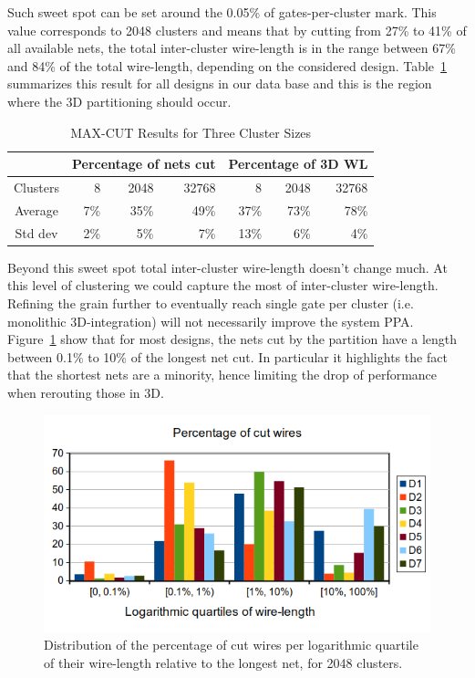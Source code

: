 \documentclass[conference]{IEEEtran}
\begin{document}
Such sweet spot can be set around the 0.05\% of gates-per-cluster mark. This value corresponds to 2048 clusters and means that by cutting from 27\% to 41\% of all available nets, the total inter-cluster wire-length is in the range between 67\% and 84\% of the total wire-length, depending on the considered design. Table~\ref{tab:res} summarizes this result for all designs in our data base and this is the region where the 3D partitioning should occur. 
\begin{table}[!t]
\renewcommand{\arraystretch}{1.25}
\caption{MAX-CUT Results for Three Cluster Sizes}
\label{tab:res}
\centering
\begin{tabular}{|c|r|r|r|r|r|r|}
\cline{2-7}
\multicolumn{1}{c|}{} & \multicolumn{3}{c|}{Percentage of nets cut} & \multicolumn{3}{c|}{Percentage of 3D WL}\\
\hline
\multicolumn{1}{|c|}{Clusters} & 8 & 2048 & 32768 & 8 & 2048 & 32768\\
\hline
Average & 7\% & 35\% & 49\% & 37\% & 73\% & 78\%\\
\hline
Std dev & 2\% & 5\% & 7\% & 13\% & 6\% & 4\%\\
\hline
\end{tabular}
\end{table}
Beyond this sweet spot total inter-cluster wire-length doesn't change much. At this level of clustering we could capture the most of inter-cluster wire-length. Refining the grain further to eventually reach single gate per cluster (i.e. monolithic 3D-integration) will not necessarily improve the system PPA.\\
Figure~\ref{fig:dits-wl-quart} show that for most designs, the nets cut by the partition have a length between 0.1\% to 10\% of the longest net cut. In particular it highlights the fact that the shortest nets are a minority, hence limiting the drop of performance when rerouting those in 3D.
\begin{figure}[!t]
\centering
\includegraphics[width=0.9\linewidth]{netCutWL_maxcut_all_log-quart_2048.png}
\caption{Distribution of the percentage of cut wires per logarithmic quartile of their wire-length relative to the longest net, for 2048 clusters.}
\label{fig:dits-wl-quart}
\end{figure}
\end{document}
